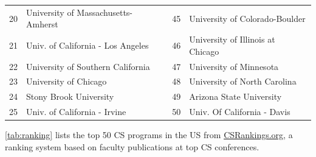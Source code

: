 \documentclass[oneside,11pt]{book}
\newcommand{\red}[1]{{\color{red}{#1}}}
\begin{document}
\begin{table}
\begin{tabular}{rl|rl}
    20 &  University of Massachusetts-Amherst\red{$^*$} &45& University of Colorado-Boulder \\
    21 & Univ. of California - Los Angeles &46& University of Illinois at Chicago  \\
    22 & University of Southern California &47& University of Minnesota \\ 
    23 & University of Chicago &48& University of North Carolina\red{$^*$} \\
    24 & Stony Brook University\red{$^*$} &49& Arizona State University\red{$^*$} \\
    25 &  Univ. of California - Irvine&50& Univ. Of California - Davis \\
    \bottomrule
  \end{tabular}
\end{table}
\autoref{tab:ranking} lists the top 50 CS programs in the US from \href{https://www.csrankings.org}{CSRankings.org}, a ranking system  based on faculty publications at top CS conferences.





\end{document}
